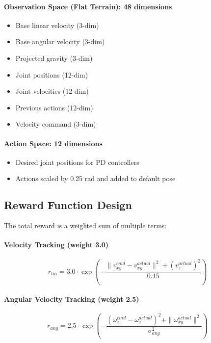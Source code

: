 \documentclass[12pt,a4paper]{article}
\begin{document}
\paragraph{Observation Space (Flat Terrain): 48 dimensions}
\begin{itemize}
    \item Base linear velocity (3-dim)
    \item Base angular velocity (3-dim)
    \item Projected gravity (3-dim)
    \item Joint positions (12-dim)
    \item Joint velocities (12-dim)
    \item Previous actions (12-dim)
    \item Velocity command (3-dim)
\end{itemize}

\paragraph{Action Space: 12 dimensions}
\begin{itemize}
    \item Desired joint positions for PD controllers
    \item Actions scaled by 0.25 rad and added to default pose
\end{itemize}

\subsection{Reward Function Design}

The total reward is a weighted sum of multiple terms:

\paragraph{Velocity Tracking (weight 3.0)}
\begin{equation}
r_{lin} = 3.0 \cdot \exp\left(-\frac{\|v_{xy}^{cmd} - v_{xy}^{actual}\|^2 + (v_z^{actual})^2}{0.15}\right)
\end{equation}

\paragraph{Angular Velocity Tracking (weight 2.5)}
\begin{equation}
r_{ang} = 2.5 \cdot \exp\left(-\frac{(\omega_z^{cmd} - \omega_z^{actual})^2 + \|\omega_{xy}^{actual}\|^2}{\sigma_{ang}^2}\right)
\end{equation}
\end{document}
